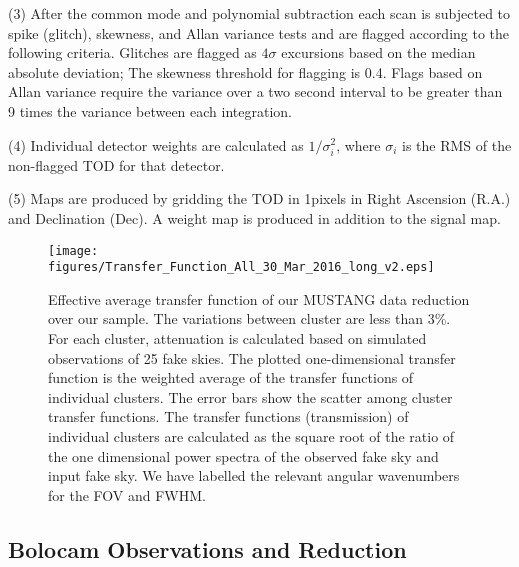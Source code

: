 \documentclass[iop,numberedappendix,apj]{emulateapj}
\begin{document}
  (3) After the common mode and polynomial subtraction each scan is subjected to spike (glitch), skewness, and Allan 
  variance tests and are flagged according to the following criteria. Glitches are flagged as $4\sigma$ excursions based
  on the median absolute deviation; The skewness threshold for flagging is 0.4. Flags based on Allan variance require
  the variance over a two second interval to be greater than 9 times the variance between each integration.

  (4) Individual detector weights are calculated as $1/ \sigma_i^2$, where $\sigma_i$ is the RMS of the non-flagged
  TOD for that detector. 

  (5) Maps are produced by gridding the TOD in 1\asec pixels in Right Ascension (R.A.) and Declination (Dec). A weight 
  map is produced in addition to the signal map.

\begin{figure}
  \begin{center}
  \texttt{[image: figures/Transfer\_Function\_All\_30\_Mar\_2016\_long\_v2.eps]}
  \end{center}
  \caption{Effective average transfer function of our MUSTANG data reduction over our sample. 
    The variations between cluster are less than 3\%. For each cluster, attenuation is
    calculated based on simulated observations of 25 fake skies. The plotted one-dimensional
    transfer function is the weighted average of the transfer functions
    of individual clusters. The error bars show the scatter among cluster transfer functions. 
    The transfer functions (transmission) of individual clusters are calculated as the square
    root of the ratio of the one dimensional power spectra of the observed fake sky
    and input fake sky. We have labelled the relevant angular wavenumbers for the FOV and FWHM.}
  \label{fig:xfer_all}
\end{figure}

\subsection{Bolocam Observations and Reduction}
\label{sec:bolocamredox}
\end{document}
